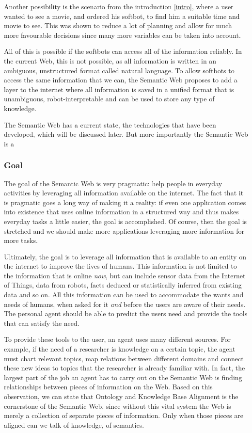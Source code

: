 \documentclass{article}
\begin{document}
 Another possibility is the scenario from the introduction \ref{intro}, where a user wanted to see a movie, and ordered his softbot, to find him a suitable time and movie to see. This was shown to reduce a lot of planning and allow for much more favourable decisions since many more variables can be taken into account.

 All of this is possible if the softbots can access all of the information reliably. In the current Web, this is not possible, as all information is written in an ambiguous, unstructured format called natural language. To allow softbots to access the same information that we can, the Semantic Web proposes to add a layer to the internet where all information is saved in a unified format that is unambiguous, robot-interpretable and can be used to store any type of knowledge.
 
 The Semantic Web has a current state, the technologies that have been developed, which will be discussed later. But more importantly the Semantic Web is a 
 
 \subsubsection{Goal}
 The goal of the Semantic Web is very pragmatic: help people in everyday activities by leveraging all information available on the internet. The fact that it is pragmatic goes a long way of making it a reality: if even one application comes into existence that uses online information in a structured way and thus makes everyday tasks a little easier, the goal is accomplished. Of course, then the goal is stretched and we should make more applications leveraging more information for more tasks.
 
 Ultimately, the goal is to leverage all information that is available to an entity on the internet to improve the lives of humans. This information is not limited to the information that is online \emph{now}, but can include sensor data from the Internet of Things, data from robots, facts deduced or statistically inferred from existing data and so on. All this information can be used to accommodate the wants and needs of humans, when asked for it \textit{and} before the users are aware of their needs. The personal agent should be able to predict the users need and provide the tools that can satisfy the need.
 
 To provide these tools to the user, an agent uses many different sources. For example, if the need of a researcher is knowledge on a certain topic, the agent must chart relevant topics, map relations between different domains and connect these new ideas to topics that the researcher is already familiar with. In fact, the largest part of the job an agent has to carry out on the Semantic Web is finding relationships between pieces of information on the Web. Based on this observation, we can state that Ontology and Knowledge Base Alignment is the cornerstone  of the Semantic Web, since without this vital system the Web is merely a collection of separate pieces of information. Only when those pieces are aligned can we talk of knowledge, of semantics.
 
\end{document}

